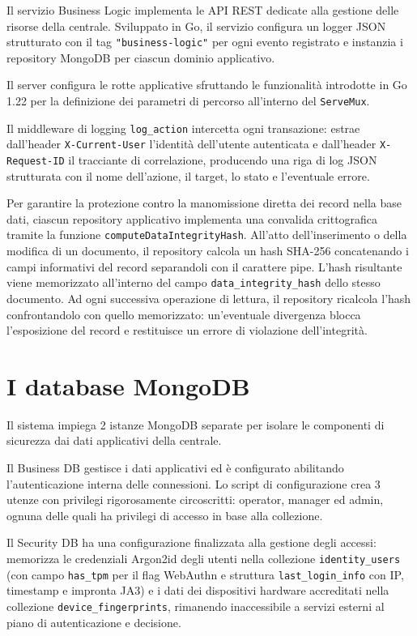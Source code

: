 Il servizio Business Logic implementa le API REST dedicate alla gestione delle risorse della centrale. Sviluppato in Go, il servizio configura un logger JSON strutturato con il tag \texttt{"business-logic"} per ogni evento registrato e instanzia i repository MongoDB per ciascun dominio applicativo.

Il server configura le rotte applicative sfruttando le funzionalità introdotte in Go 1.22 per la definizione dei parametri di percorso all'interno del \texttt{ServeMux}.

Il middleware di logging \texttt{log\_action} intercetta ogni transazione: estrae dall'header \texttt{X-Current-User} l'identità dell'utente autenticata  e dall'header \texttt{X-Request-ID} il tracciante di correlazione, producendo una riga di log JSON strutturata con il nome dell'azione, il target, lo stato e l'eventuale errore.

Per garantire la protezione contro la manomissione diretta dei record nella base dati, ciascun repository applicativo implementa una convalida crittografica tramite la funzione \texttt{computeDataIntegrityHash}. All'atto dell'inserimento o della modifica di un documento, il repository calcola un hash SHA-256 concatenando i campi informativi del record separandoli con il carattere pipe. L'hash risultante viene memorizzato all'interno del campo \texttt{data\_integrity\_hash} dello stesso documento. Ad ogni successiva operazione di lettura, il repository ricalcola l'hash confrontandolo con quello memorizzato: un'eventuale divergenza blocca l'esposizione del record e restituisce un errore di violazione dell'integrità.

\section{I database MongoDB}
\label{sec:databasemongo}

Il sistema impiega 2 istanze MongoDB separate per isolare le componenti di sicurezza dai dati applicativi della centrale.

Il Business DB gestisce i dati applicativi ed è configurato abilitando l'autenticazione interna delle connessioni. Lo script di configurazione crea 3 utenze con privilegi rigorosamente circoscritti: operator, manager ed admin, ognuna delle quali ha privilegi di accesso in base alla collezione.

Il Security DB ha una configurazione finalizzata alla gestione degli accessi: memorizza le credenziali Argon2id degli utenti nella collezione \texttt{identity\_users} (con campo \texttt{has\_tpm} per il flag WebAuthn e struttura \texttt{last\_login\_info} con IP, timestamp e impronta JA3) e i dati dei dispositivi hardware accreditati nella collezione \texttt{device\_fingerprints}, rimanendo inaccessibile a servizi esterni al piano di autenticazione e decisione.

